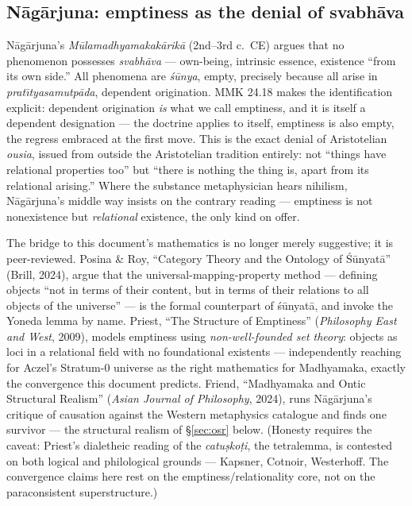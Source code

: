 \documentclass[11pt]{article}
\theoremstyle{plain}
\theoremstyle{definition}
\theoremstyle{remark}
\begin{document}
\subsection{N\=ag\=arjuna: emptiness as the denial of svabh\=ava}

N\=ag\=arjuna's \emph{M\=ulamadhyamakak\=arik\=a} (2nd--3rd c.\ CE) argues that no phenomenon possesses \emph{svabh\=ava} --- own-being, intrinsic essence, existence ``from its own side.'' All phenomena are \emph{\'s\=unya}, empty, precisely because all arise in \emph{prat\={\i}tyasamutp\=ada}, dependent origination. MMK 24.18 makes the identification explicit: dependent origination \emph{is} what we call emptiness, and it is itself a dependent designation --- the doctrine applies to itself, emptiness is also empty, the regress embraced at the first move. This is the exact denial of Aristotelian \emph{ousia}, issued from outside the Aristotelian tradition entirely: not ``things have relational properties too'' but ``there is nothing the thing is, apart from its relational arising.'' Where the substance metaphysician hears nihilism, N\=ag\=arjuna's middle way insists on the contrary reading --- emptiness is not nonexistence but \emph{relational} existence, the only kind on offer.

The bridge to this document's mathematics is no longer merely suggestive; it is peer-reviewed. Posina \& Roy, ``Category Theory and the Ontology of \'S\=unyat\=a'' (Brill, 2024), argue that the universal-mapping-property method --- defining objects ``not in terms of their content, but in terms of their relations to all objects of the universe'' --- is the formal counterpart of \'s\=unyat\=a, and invoke the Yoneda lemma by name. Priest, ``The Structure of Emptiness'' (\emph{Philosophy East and West}, 2009), models emptiness using \emph{non-well-founded set theory}: objects as loci in a relational field with no foundational existents --- independently reaching for Aczel's Stratum-0 universe as the right mathematics for Madhyamaka, exactly the convergence this document predicts. Friend, ``Madhyamaka and Ontic Structural Realism'' (\emph{Asian Journal of Philosophy}, 2024), runs N\=ag\=arjuna's critique of causation against the Western metaphysics catalogue and finds one survivor --- the structural realism of \S\ref{sec:osr} below. (Honesty requires the caveat: Priest's dialetheic reading of the \emph{catu\d{s}ko\d{t}i}, the tetralemma, is contested on both logical and philological grounds --- Kapsner, Cotnoir, Westerhoff. The convergence claims here rest on the emptiness/relationality core, not on the paraconsistent superstructure.)
\end{document}
